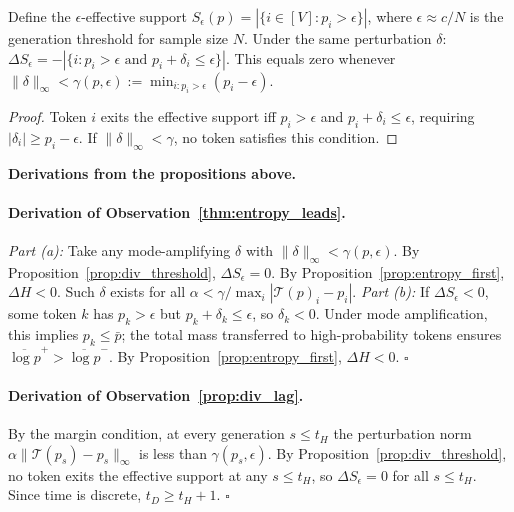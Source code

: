 \begin{proposition}\label{prop:div_threshold}
Define the $\epsilon$-effective support $S_\epsilon(p) = |\{i \in [V]: p_i > \epsilon\}|$, where $\epsilon \approx c/N$ is the generation threshold for sample size $N$.
Under the same perturbation $\delta$: $\Delta S_\epsilon = -|\{i: p_i > \epsilon \text{ and } p_i + \delta_i \leq \epsilon\}|$.
This equals zero whenever $\|\delta\|_\infty < \gamma(p,\epsilon) := \min_{i: p_i > \epsilon}(p_i - \epsilon)$.
\end{proposition}

\begin{proof}
Token $i$ exits the effective support iff $p_i > \epsilon$ and $p_i + \delta_i \leq \epsilon$, requiring $|\delta_i| \geq p_i - \epsilon$.
If $\|\delta\|_\infty < \gamma$, no token satisfies this condition.
\end{proof}

\medskip
\noindent\textbf{Derivations from the propositions above.}

\paragraph{Derivation of Observation~\ref{thm:entropy_leads}.}
\emph{Part (a):} Take any mode-amplifying $\delta$ with $\|\delta\|_\infty < \gamma(p,\epsilon)$.
By Proposition~\ref{prop:div_threshold}, $\Delta S_\epsilon = 0$.
By Proposition~\ref{prop:entropy_first}, $\Delta H < 0$.
Such $\delta$ exists for all $\alpha < \gamma / \max_i |\mathcal{T}(p)_i - p_i|$.
\emph{Part (b):} If $\Delta S_\epsilon < 0$, some token $k$ has $p_k > \epsilon$ but $p_k + \delta_k \leq \epsilon$, so $\delta_k < 0$.
Under mode amplification, this implies $p_k \leq \bar{p}$; the total mass transferred to high-probability tokens ensures $\overline{\log p}^+ > \overline{\log p}^-$.
By Proposition~\ref{prop:entropy_first}, $\Delta H < 0$. $\square$

\paragraph{Derivation of Observation~\ref{prop:div_lag}.}
By the margin condition, at every generation $s \leq t_H$ the perturbation norm $\alpha\|\mathcal{T}(p_s) - p_s\|_\infty$ is less than $\gamma(p_s, \epsilon)$.
By Proposition~\ref{prop:div_threshold}, no token exits the effective support at any $s \leq t_H$, so $\Delta S_\epsilon = 0$ for all $s \leq t_H$.
Since time is discrete, $t_D \geq t_H + 1$. $\square$

